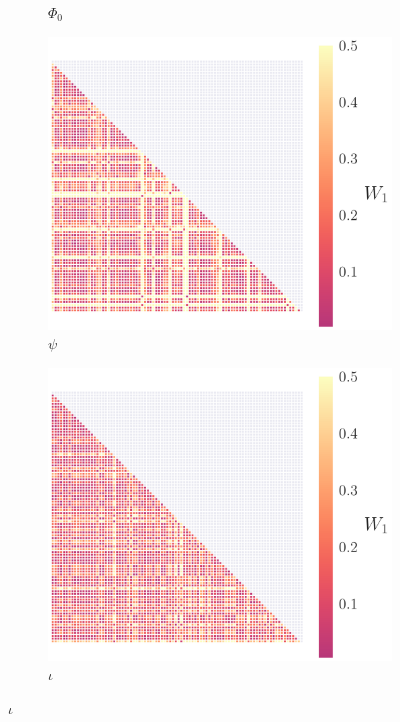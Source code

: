 \documentclass[fleqn,usenatbib,useAMS]{mnras}
\begin{document}
\begin{figure}
\begin{subfigure}[b]{0.22\textwidth}
		\caption{$\Phi_0$}
	\end{subfigure}
	\hfill	
	\begin{subfigure}[b]{0.22\textwidth}
		\includegraphics[width=\textwidth]{images/WD_2}
		\caption{$\psi$} \label{figWD_psi}
	\end{subfigure}
	\hfill
	\begin{subfigure}[b]{0.22\textwidth}
		\includegraphics[width=\textwidth]{images/WD_3}
		\caption{$\iota$}
	\end{subfigure}

\end{figure}
\end{document}
